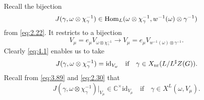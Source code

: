 \documentclass[11pt]{amsart}
\theoremstyle{definition}
\begin{document}
Recall the bijection
\[
J(\gamma,\omega \otimes \chi_\gamma^{-1}) \in {{\rm Hom}}_L (\omega \otimes \chi_\gamma^{-1},
w^{-1} (\omega) \otimes \gamma^{-1}) 
\]
from \eqref{eq:2.22}. It restricts to a bijection
\[
V_\mu = e_\mu V_{\omega \otimes \chi_\gamma^{-1}} \to
V_\mu = e_\mu V_{w^{-1} (\omega) \otimes \gamma^{-1}} .
\]
Clearly \eqref{eq:4.1} enables us to take
\begin{equation} \label{eq:3.55}
J(\gamma,\omega \otimes \chi_\gamma^{-1}) = \mathrm{id}_{V_\omega} 
\quad \text{if} \quad \gamma \in X_{{\rm nr}}(L / L^\sharp Z(G)) .
\end{equation}
Recall from \eqref{eq:3.89} and \eqref{eq:2.30} that 
\begin{equation}\label{eq:4.90}
J(\gamma,\omega \otimes \chi_\gamma^{-1}) |_{V_{\mu }} \in {\mathbb C}^\times 
\mathrm{id}_{V_{\mu }} \quad \text{if} \quad \gamma \in X^L (\omega,V_{\mu }) .
\end{equation}
\end{document}
